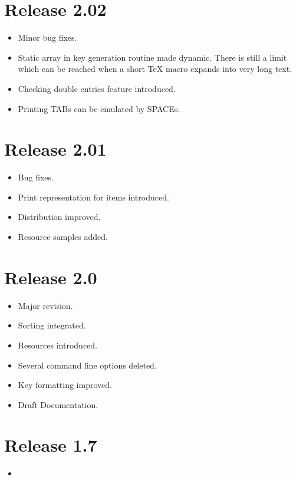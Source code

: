 \documentclass[11pt,a4paper]{scrartcl}
\newenvironment{Release}[2]{%
  \def\tmp{#2}%
  \section*{Release #1 \ifx\tmp\empty\else{\normalsize[#2]}\fi}
  \begin{itemize}
}{\end{itemize}}
\newenvironment{Fix}[1]{\item }{}
\newenvironment{New}[1]{\item }{}
\newenvironment{Doc}[1]{\item }{}
\newenvironment{Update}[1]{\item }{}
\begin{document}
\begin{multicols}
 \begin{Release}{2.02}{}
  \begin{Fix}{gene}
    Minor bug fixes.
  \end{Fix}
  \begin{Update}{gene}
    Static array in key generation routine made dynamic. There is
    still a limit which can be reached when a short \TeX{} macro
    expands into very long text.
  \end{Update}
  \begin{New}{gene}
    Checking double entries feature introduced.
  \end{New}
  \begin{New}{gene}
    Printing TABs can be emulated by SPACEs.
  \end{New}
 \end{Release}

 \begin{Release}{2.01}{}
  \begin{Fix}{gene}
    Bug fixes.
  \end{Fix}
  \begin{New}{gene}
    Print representation for items introduced.
  \end{New}
  \begin{Update}{gene}
    Distribution improved.
  \end{Update}
  \begin{New}{gene}
    Resource samples added.
  \end{New}
 \end{Release}

 \begin{Release}{2.0}{}
  \begin{New}{gene}
    Major revision.
  \end{New}
  \begin{New}{gene}
    Sorting integrated.
  \end{New}
  \begin{New}{gene}
    Resources introduced.
  \end{New}
  \begin{Update}{gene}
    Several command line options deleted.
  \end{Update}
  \begin{Update}{gene}
    Key formatting improved.
  \end{Update}
  \begin{Doc}{gene}
    Draft Documentation.
  \end{Doc}
 \end{Release}

 \begin{Release}{1.7}{}
  \item[]
 \end{Release}

\end{multicols}
\end{document}
